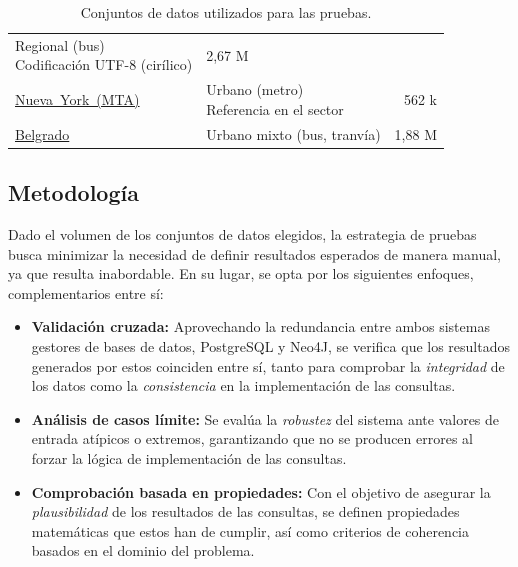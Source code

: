 \begin{table}[H]
\begin{tabular}{@{}llr@{}}
        \makecell[lt]{
            Regional (bus) \\
            Codificación UTF-8 (cirílico)
        } &
        2,67 M \\
        \addlinespace
        \mbox{\href{https://www.mta.info/developers}{Nueva York (MTA)}} &
        \makecell[lt]{
            Urbano (metro) \\
            Referencia en el sector
        } &
        562 k \\
        \addlinespace
        \mbox{\href{https://mobilitydatabase.org/feeds/gtfs/mdb-1027}{Belgrado}} &
        \makecell[lt]{
            Urbano mixto (bus, tranvía) \\
        } &
        1,88 M \\
        \bottomrule
    \end{tabular}
    \caption{Conjuntos de datos utilizados para las pruebas.}
    \label{test:datasets}
\end{table}

\subsection{Metodología}

Dado el volumen de los conjuntos de datos elegidos, la estrategia de pruebas busca minimizar la necesidad de definir resultados esperados de manera manual, ya que resulta inabordable. En su lugar, se opta por los siguientes enfoques, complementarios entre sí:

\begin{itemize}
    \item \textbf{Validación cruzada:} Aprovechando la redundancia entre ambos sistemas gestores de bases de datos, PostgreSQL y Neo4J, se verifica que los resultados generados por estos coinciden entre sí, tanto para comprobar la \textit{integridad} de los datos como la \textit{consistencia} en la implementación de las consultas.
    \item \textbf{Análisis de casos límite:} Se evalúa la \textit{robustez} del sistema ante valores de entrada atípicos o extremos, garantizando que no se producen errores al forzar la lógica de implementación de las consultas.
    \item \textbf{Comprobación basada en propiedades:} Con el objetivo de asegurar la \textit{plausibilidad} de los resultados de las consultas, se definen propiedades matemáticas que estos han de cumplir, así como criterios de coherencia basados en el dominio del problema.
\end{itemize}

